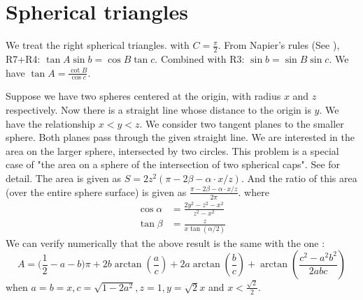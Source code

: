 \documentclass{article}
\begin{document}
\section{Spherical triangles}
We treat the  right spherical triangles. with $C=\frac{\pi}{2}$.
From Napier's rules
(See \cite{Napier}),
R7+R4: $\tan A \sin b = \cos B \tan c$.
Combined with R3: $\sin b = \sin B \sin c$.
We have $\tan A = \frac{\cot B}{\cos c}$.

Suppose we have two spheres centered at the origin, with radius $x$ and $z$ respectively.
Now there is a straight line whose distance to the origin is $y$.
We have the relationship $x<y<z$.
We consider two tangent planes to the smaller sphere.
Both planes pass through the given straight line.
We are interested in the area
on the larger sphere,
intersected by two circles.
This problem is a special case
of "the area on a sphere of the intersection of two spherical caps".
See \cite{intersection}
for detail.
The area is given as $S=2z^2(\pi - 2\beta - \alpha \cdot x/z)$.
And the ratio of this area (over the entire sphere surface)
is given as
$\frac{\pi - 2\beta - \alpha \cdot x/z}{2\pi}$.
where
\begin{align}
\cos \alpha & = \frac{2y^2 - z^2 - x^2}{
    z^2 - x^2 }\\
\tan \beta &= \frac{z}{ 
    x  \tan(\alpha/2)}
\end{align}
We can verify numerically that the above result is the same with 
the one \cite{orthogonal}:
\begin{equation}
    A=\big(\frac 12-a-b\big)\pi + 2b\arctan(\frac ac)+2a\arctan(\frac bc)+\arctan(\frac{c^2-a^2 b^2}{2abc})
\end{equation}
when $a=b=x, c=\sqrt{1-2a^2}, z=1,y=\sqrt{2}x$ and $x<\frac{\sqrt{2}}{2}$.



\end{document}
